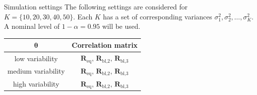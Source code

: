 \documentclass[
  11pt,
  ignorenonframetext,
]{beamer}
\begin{document}
\begin{frame}{Simulation settings}
\label{simulation-settings}
The following settings are considered for
\(K = \{10, 20, 30, 40, 50\}\). Each \(K\) has a set of corresponding
variances \(\sigma^2_1, \sigma^2_2,\ldots,\sigma^2_K\). A nominal level
of \(1-\alpha=0.95\) will be used.

\begin{center}
\begin{tabular}{ |c|c| }
\hline
$\boldsymbol{\theta}$ & Correlation matrix \\
\hline \hline
low variability & $\mathbf{R}_{\text{eq}},\, \mathbf{R}_{\text{bl,2}},\, \mathbf{R}_{\text{bl,3}}$ \\
medium variability & $\mathbf{R}_{\text{eq}},\, \mathbf{R}_{\text{bl,2}},\, \mathbf{R}_{\text{bl,3}}$ \\  
high variability & $\mathbf{R}_{\text{eq}},\, \mathbf{R}_{\text{bl,2}},\, \mathbf{R}_{\text{bl,3}}$ \\
\hline
\end{tabular}
\end{center}

\end{frame}
\end{document}
